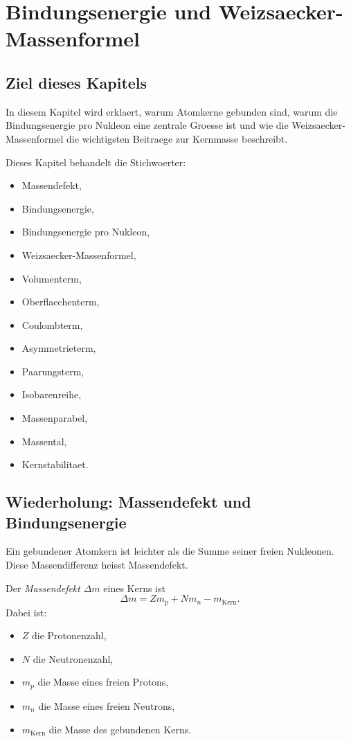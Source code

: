 \chapter{Bindungsenergie und Weizsaecker-Massenformel}

\section{Ziel dieses Kapitels}

In diesem Kapitel wird erklaert, warum Atomkerne gebunden sind, warum die
Bindungsenergie pro Nukleon eine zentrale Groesse ist und wie die
Weizsaecker-Massenformel die wichtigsten Beitraege zur Kernmasse beschreibt.

\begin{notebox}
Dieses Kapitel behandelt die Stichwoerter:
\begin{itemize}
    \item Massendefekt,
    \item Bindungsenergie,
    \item Bindungsenergie pro Nukleon,
    \item Weizsaecker-Massenformel,
    \item Volumenterm,
    \item Oberflaechenterm,
    \item Coulombterm,
    \item Asymmetrieterm,
    \item Paarungsterm,
    \item Isobarenreihe,
    \item Massenparabel,
    \item Massental,
    \item Kernstabilitaet.
\end{itemize}
\end{notebox}

\section{Wiederholung: Massendefekt und Bindungsenergie}

Ein gebundener Atomkern ist leichter als die Summe seiner freien Nukleonen.
Diese Massendifferenz heisst Massendefekt.

\begin{definitionbox}
Der \emph{Massendefekt} $\Delta m$ eines Kerns ist
\[
    \Delta m = Zm_p + Nm_n - m_{\mathrm{Kern}}.
\]
Dabei ist:
\begin{itemize}
    \item $Z$ die Protonenzahl,
    \item $N$ die Neutronenzahl,
    \item $m_p$ die Masse eines freien Protons,
    \item $m_n$ die Masse eines freien Neutrons,
    \item $m_{\mathrm{Kern}}$ die Masse des gebundenen Kerns.
\end{itemize}
\end{definitionbox}


